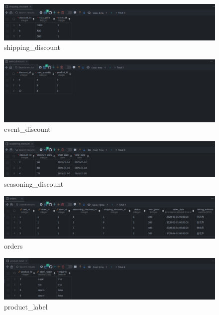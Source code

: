 \documentclass[a4paper, 12pt]{article}
\begin{document}
\begin{figure}[hp]
    \centerline{\includegraphics[width=\linewidth]{snapshot/shipping_discount.png}}
    \caption{shipping_discount}
\end{figure}

\begin{figure}[hp]
    \centerline{\includegraphics[width=\linewidth]{snapshot/event_discount.png}}
    \caption{event_discount}
\end{figure}

\begin{figure}[hp]
    \centerline{\includegraphics[width=\linewidth]{snapshot/seasoning_discount.png}}
    \caption{seasoning_discount}
\end{figure}

\begin{figure}[hp]
    \centerline{\includegraphics[width=\linewidth]{snapshot/orders.png}}
    \caption{orders}
\end{figure}

\begin{figure}[hp]
    \centerline{\includegraphics[width=\linewidth]{snapshot/product_label.png}}
    \caption{product_label}
\end{figure}
\end{document}
